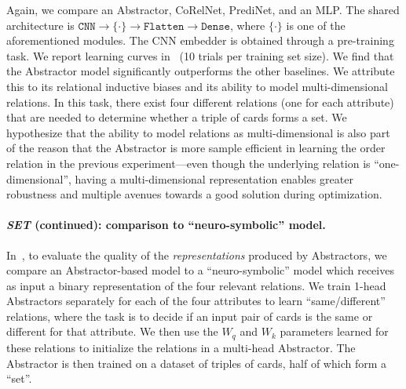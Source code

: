 Again, we compare an Abstractor, CoRelNet, PrediNet, and an MLP. The shared architecture is $\texttt{CNN} \to \{\cdot\} \to \texttt{Flatten} \to \texttt{Dense}$, where $\{\cdot\}$ is one of the aforementioned modules. The CNN embedder is obtained through a pre-training task. We report learning curves in~ (10 trials per training set size). We find that the Abstractor model significantly outperforms the other baselines. We attribute this to its relational inductive biases and its ability to model multi-dimensional relations. In this task, there exist four different relations (one for each attribute) that are needed to determine whether a triple of cards forms a set.
We hypothesize that the ability to model relations as multi-dimensional is also part of the reason that the Abstractor is more sample efficient in learning the order relation in the previous experiment---even though the underlying relation is ``one-dimensional'', having a multi-dimensional representation enables greater robustness and multiple avenues towards a good solution during optimization.

\paragraph{\textit{SET} (continued): comparison to ``neuro-symbolic'' model.}
In~, to evaluate the quality of the \textit{representations} produced by Abstractors, we compare an Abstractor-based model to a ``neuro-symbolic'' model which receives as input a binary representation of the four relevant relations. We train 1-head Abstractors separately for each of the four attributes to learn ``same/different'' relations, where the task is to decide if an input pair of cards is the same or different for that attribute. We then use the $W_q$ and $W_k$ parameters learned for these relations to initialize the relations in a multi-head Abstractor. The Abstractor is then trained on a dataset of triples of cards, half of which form a ``set''.

